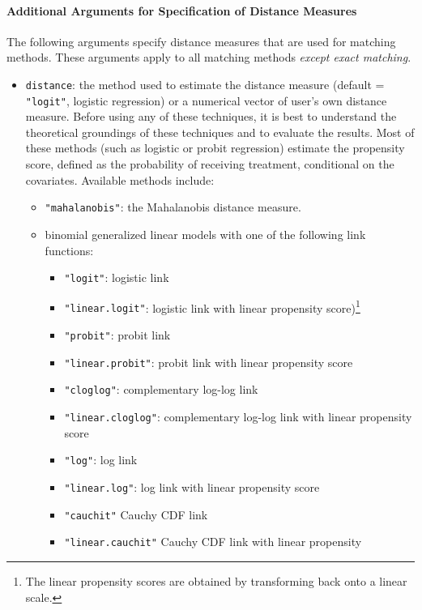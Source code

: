 \paragraph{Additional Arguments for Specification of
  Distance Measures}
\label{subsubsec:inputs-all}

The following arguments specify distance measures that are used for
matching methods. These arguments apply to all matching methods {\it
  except exact matching}.

\begin{itemize}
  
\item \texttt{distance}: the method used to estimate the distance
  measure (default = {\tt "logit"}, logistic regression) or a
  numerical vector of user's own distance measure.  Before using any
  of these techniques, it is best to understand the theoretical
  groundings of these techniques and to evaluate the results.  Most of
  these methods (such as logistic or probit regression) estimate the
  propensity score, defined as the probability of receiving treatment,
  conditional on the covariates.  Available methods include:
  \begin{itemize}
  \item {\tt "mahalanobis"}: the Mahalanobis distance measure.
  \item binomial generalized linear models with one of the following
    link functions:
    \begin{itemize}
    \item \texttt{"logit"}: logistic link 
    \item {\tt "linear.logit"}: logistic link with linear propensity
      score)\footnote{The linear propensity scores are obtained by
        transforming back onto a linear scale.}
    \item \texttt{"probit"}: probit link
    \item {\tt "linear.probit"}: probit link with linear propensity
      score
    \item {\tt "cloglog"}: complementary log-log link
    \item {\tt "linear.cloglog"}: complementary log-log link with linear
      propensity score
    \item {\tt "log"}: log link
    \item {\tt "linear.log"}: log link with linear propensity score
    \item {\tt "cauchit"} Cauchy CDF link
    \item {\tt "linear.cauchit"} Cauchy CDF link with linear propensity

\end{itemize}
\end{itemize}
\end{itemize}
